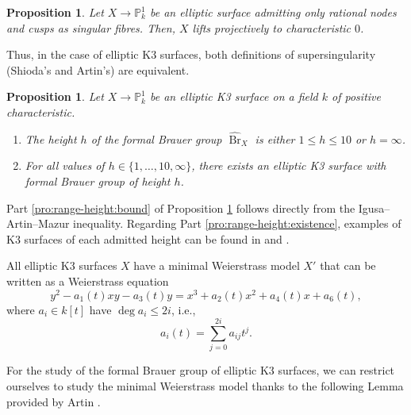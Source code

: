 \documentclass{report}
\DeclareMathOperator{\Br}{Br}
\newtheorem{proposition}[equation]{Proposition}
\theoremstyle{definition}
\begin{document}
\begin{proposition}
Let $X\rightarrow\mathbb{P}_k^1$ be an elliptic surface admitting only rational nodes and cusps as singular fibres. Then, $X$ lifts projectively to characteristic $0$.
\end{proposition}

Thus, in the case of elliptic K3 surfaces, both definitions of supersingularity (Shioda's and Artin's) are equivalent.

\begin{proposition}
\label{pro:range-height}
Let $X\rightarrow\mathbb{P}_k^1$ be an elliptic K3 surface on a field $k$ of positive characteristic.
\begin{enumerate}
\item\label{pro:range-height:bound} The height $h$ of the formal Brauer group $\widehat{\Br}_X$ is either $1\leq h\leq10$ or $h=\infty$.
\item\label{pro:range-height:existence} For all values of $h\in\{1,\ldots,10,\infty\}$, there exists an elliptic K3 surface with formal Brauer group of height $h$.
\end{enumerate}
\end{proposition}

Part \ref{pro:range-height:bound} of Proposition \ref{pro:range-height} follows directly from the Igusa--Artin--Mazur inequality. Regarding Part \ref{pro:range-height:existence}, examples of K3 surfaces of each admitted height can be found in \cite[Corollary~7.7]{artin1974supersingular} and \cite[Remark~2.9]{milne1976duality}.
\vspace{2mm}

All elliptic K3 surfaces $X$ have a minimal Weierstrass model $X'$ that can be written as a Weierstrass equation
\begin{equation}
\label{eq:weierstrass-minimal}
y^2-a_1(t)xy-a_3(t)y=x^3+a_2(t)x^2+a_4(t)x+a_6(t),
\end{equation}
where $a_i\in k[t]$ have $\deg a_i\leq2i$, i.e.,
\[a_i(t)=\sum_{j=0}^{2i}a_{ij}t^j.\]

For the study of the formal Brauer group of elliptic K3 surfaces, we can restrict ourselves to study the minimal Weierstrass model thanks to the following Lemma provided by Artin \cite[Lemma~1.8]{artin1974supersingular}.
\end{document}
